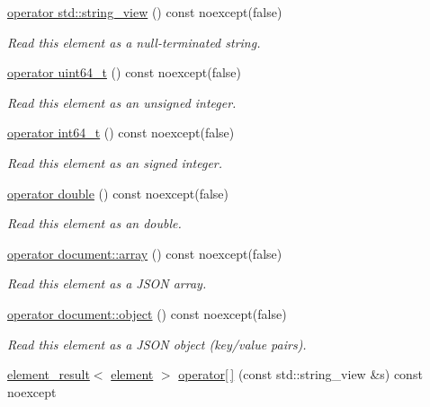\begin{DoxyCompactItemize}
\hyperlink{classsimdjson_1_1document_1_1element_ad907f21076cc2a2f1352234fe18c8f94}{operator std\+::string\+\_\+view} () const noexcept(false)
\begin{DoxyCompactList}\small\item\em Read this element as a null-\/terminated string. \end{DoxyCompactList}\item 
\hyperlink{classsimdjson_1_1document_1_1element_aeeef4b2e6eec31f6eb5a87930ce4f859}{operator uint64\+\_\+t} () const noexcept(false)
\begin{DoxyCompactList}\small\item\em Read this element as an unsigned integer. \end{DoxyCompactList}\item 
\hyperlink{classsimdjson_1_1document_1_1element_a89305767fe78b8ad76fadf0f2f5e2836}{operator int64\+\_\+t} () const noexcept(false)
\begin{DoxyCompactList}\small\item\em Read this element as an signed integer. \end{DoxyCompactList}\item 
\hyperlink{classsimdjson_1_1document_1_1element_a063b979cbc6960b4370d074b76455e7a}{operator double} () const noexcept(false)
\begin{DoxyCompactList}\small\item\em Read this element as an double. \end{DoxyCompactList}\item 
\hyperlink{classsimdjson_1_1document_1_1element_ac217a7d104132a849a4c63820af91da8}{operator document\+::array} () const noexcept(false)
\begin{DoxyCompactList}\small\item\em Read this element as a J\+S\+ON array. \end{DoxyCompactList}\item 
\hyperlink{classsimdjson_1_1document_1_1element_ac9f7dd43808385b7ec89ea667a6cddc2}{operator document\+::object} () const noexcept(false)
\begin{DoxyCompactList}\small\item\em Read this element as a J\+S\+ON object (key/value pairs). \end{DoxyCompactList}\item 
\hyperlink{classsimdjson_1_1document_1_1element__result}{element\+\_\+result}$<$ \hyperlink{classsimdjson_1_1document_1_1element}{element} $>$ \hyperlink{classsimdjson_1_1document_1_1element_ae7c594595c73a015d9a8bce46e52f46f}{operator\mbox{[}$\,$\mbox{]}} (const std\+::string\+\_\+view \&s) const noexcept

\end{DoxyCompactItemize}
